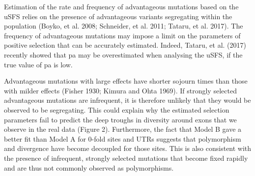 Estimation of the rate and frequency of advantageous mutations based on the uSFS relies on the presence of advantageous variants segregating within the population (Boyko, et al. 2008; Schneider, et al. 2011; Tataru, et al. 2017). The frequency of advantageous mutations may impose a limit on the parameters of positive selection that can be accurately estimated. Indeed, Tataru, et al. (2017) recently showed that pa may be overestimated when analysing the uSFS, if the true value of pa is low. 

Advantageous mutations with large effects have shorter sojourn times than those with milder effects (Fisher 1930; Kimura and Ohta 1969). If strongly selected advantageous mutations are infrequent, it is therefore unlikely that they would be observed to be segregating. This could explain why the estimated selection parameters fail to predict the deep troughs in diversity around exons that we observe in the real data (Figure 2). Furthermore, the fact that Model B gave a better fit than Model A for 0-fold sites and UTRs suggests that polymorphism and divergence have become decoupled for those sites. This is also consistent with the presence of infrequent, strongly selected mutations that become fixed rapidly and are thus not commonly observed as polymorphisms. 

